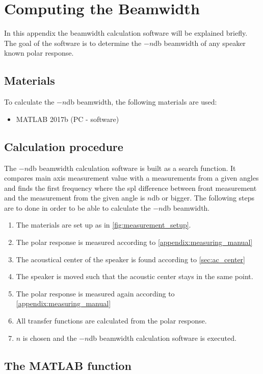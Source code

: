 \chapter{Computing the Beamwidth}\label{appendix:beamwidth}
In this appendix the beamwidth calculation software will be explained briefly. The goal of the software is to determine the $-n$\si{\decibel} beamwidth of any speaker known polar response.

\section*{Materials}
To calculate the $-n$\si{\decibel} beamwidth, the following materials are used:
\begin{itemize}
\item MATLAB 2017b (PC - software)
\end{itemize}


\section*{Calculation procedure}
The $-n$\si{\decibel} beamwidth calculation software is built as a search function. It compares main axis measurement value with a measurements from a given angles and finds the first frequency where the \gls{spl} difference between front measurement and the measurement from the given angle is $n$\si{\decibel} or bigger. The following steps are to done in order to be able to calculate the $-n$\si{\decibel} beamwidth.

\begin{enumerate}
\item The materials are set up as in \autoref{fig:measurement_setup}.
\item The polar response is measured according to \autoref{appendix:measuring_manual}
\item The acoustical center of the speaker is found according to \autoref{sec:ac_center}
\item  The speaker is moved such that the acoustic center stays in the same point. 
\item The polar response is measured again according to \autoref{appendix:measuring_manual}
\item All transfer functions are calculated from the polar response.
\item $n$ is chosen and the  $-n$\si{\decibel} beamwidth calculation software is executed.
\end{enumerate}


\section*{The MATLAB function}
